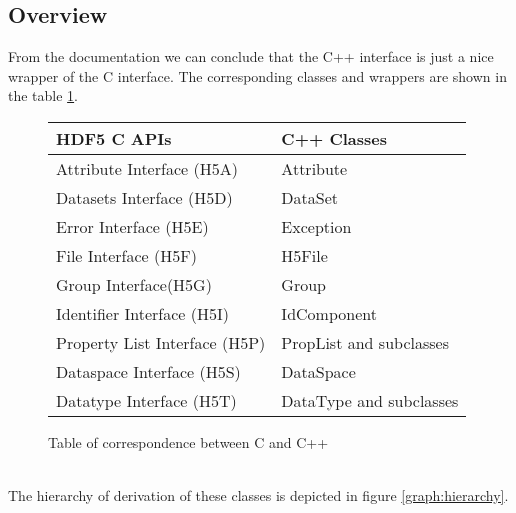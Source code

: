 \documentclass{article}
\begin{document}
\subsection{Overview}
From the documentation we can conclude that the C++ interface is just a nice wrapper of the C interface. The corresponding classes and wrappers are shown in the table \ref{table:corrs}.\\
\begin{figure}[ht!]
\centering
\begin{tabular}{|l|l|}
\hline
HDF5 C APIs&C++ Classes\\
\hline
Attribute Interface (H5A)&Attribute\\
Datasets Interface (H5D)&DataSet\\
Error Interface (H5E)&Exception\\
File Interface (H5F)&H5File\\
Group Interface(H5G)&Group\\
Identifier Interface (H5I)&IdComponent\\
Property List Interface (H5P)&PropList and subclasses\\
Dataspace Interface (H5S)&DataSpace\\
Datatype Interface (H5T)&DataType and subclasses\\
\hline
\end{tabular}
\caption{Table of correspondence between C and C++}
\label{table:corrs}
\end{figure}\\
The hierarchy of derivation of these classes is depicted in figure \ref{graph:hierarchy}.
\end{document}
